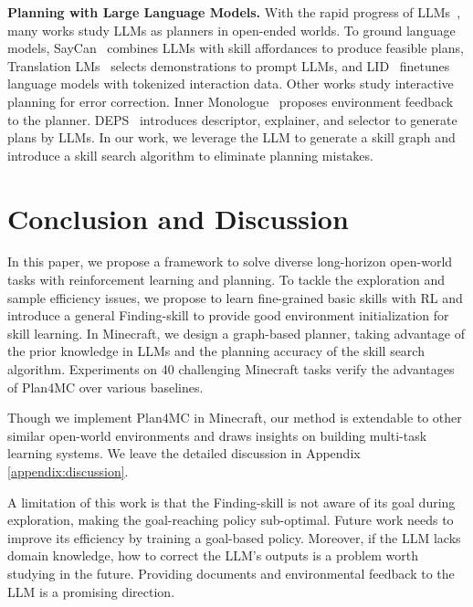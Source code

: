 \documentclass{article}
\begin{document}
\textbf{Planning with Large Language Models.} With the rapid progress of LLMs~\citep{gpt, palm}, many works study LLMs as planners in open-ended worlds. To ground language models, SayCan~\citep{saycan} combines LLMs with skill affordances to produce feasible plans, Translation LMs~\citep{translation-lm} selects demonstrations to prompt LLMs, and LID~\citep{lid} finetunes language models with tokenized interaction data. Other works study interactive planning for error correction. Inner Monologue~\citep{inner-monologue} proposes environment feedback to the planner. DEPS~\citep{deps} introduces descriptor, explainer, and selector to generate plans by LLMs. In our work, we leverage the LLM to generate a skill graph and introduce a skill search algorithm to eliminate planning mistakes.

\section{Conclusion and Discussion}
In this paper, we propose a framework to solve diverse long-horizon open-world tasks with reinforcement learning and planning. 
To tackle the exploration and sample efficiency issues, we propose to learn fine-grained basic skills with RL and introduce a general Finding-skill to provide good environment initialization for skill learning.
In Minecraft, we design a graph-based planner, taking advantage of the prior knowledge in LLMs and the planning accuracy of the skill search algorithm.
Experiments on 40 challenging Minecraft tasks verify the advantages of Plan4MC over various baselines. 

Though we implement Plan4MC in Minecraft, our method is extendable to other similar open-world environments and draws insights on building multi-task learning systems. We leave the detailed discussion in Appendix \ref{appendix:discussion}.


A limitation of this work is that the Finding-skill is not aware of its goal during exploration, making the goal-reaching policy sub-optimal.  %
Future work needs to improve its efficiency by training a goal-based policy. Moreover, if the LLM lacks domain knowledge, how to correct the LLM's outputs is a problem worth studying in the future. Providing documents and environmental feedback to the LLM is a promising direction.
\end{document}
